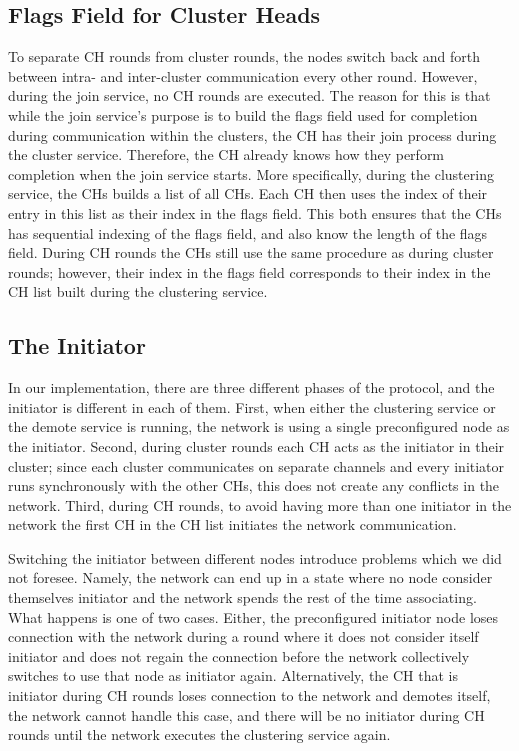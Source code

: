\subsection{Flags Field for Cluster Heads}
To separate CH rounds from cluster rounds, the nodes switch back and forth between intra- and inter-cluster communication every other round. However, during the join service, no CH rounds are executed. The reason for this is that while the join service's purpose is to build the flags field used for completion during communication within the clusters, the CH has their join process during the cluster service. Therefore, the CH already knows how they perform completion when the join service starts. More specifically, during the clustering service, the CHs builds a list of all CHs. Each CH then uses the index of their entry in this list as their index in the flags field. This both ensures that the CHs has sequential indexing of the flags field, and also know the length of the flags field. During CH rounds the CHs still use the same procedure as during cluster rounds; however, their index in the flags field corresponds to their index in the CH list built during the clustering service.

\subsection{The Initiator}
\label{subsec:implementation_the-initiator}
In our implementation, there are three different phases of the protocol, and the initiator is different in each of them. First, when either the clustering service or the demote service is running, the network is using a single preconfigured node as the initiator. Second, during cluster rounds each CH acts as the initiator in their cluster; since each cluster communicates on separate channels and every initiator runs synchronously with the other CHs, this does not create any conflicts in the network. Third, during CH rounds, to avoid having more than one initiator in the network the first CH in the CH list initiates the network communication.

Switching the initiator between different nodes introduce problems which we did not foresee. Namely, the network can end up in a state where no node consider themselves initiator and the network spends the rest of the time associating. What happens is one of two cases. Either, the preconfigured initiator node loses connection with the network during a round where it does not consider itself initiator and does not regain the connection before the network collectively switches to use that node as initiator again. Alternatively, the CH that is initiator during CH rounds loses connection to the network and demotes itself, the network cannot handle this case, and there will be no initiator during CH rounds until the network executes the clustering service again. 

